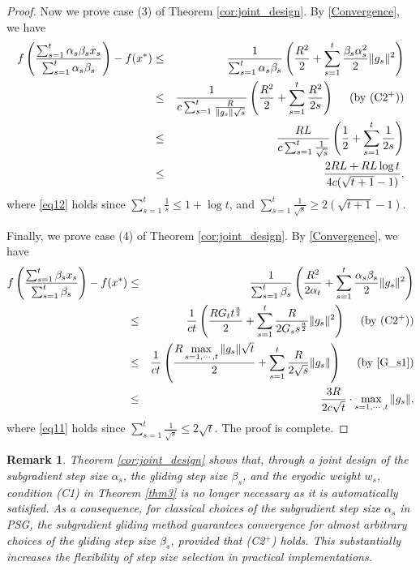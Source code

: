 \documentclass[sn-mathphys]{JORSC-jnl}%
\theoremstyle{thmstyleone}%
\newtheorem{remark}{Remark}[section]%
\theoremstyle{thmstylethree}%
\begin{document}
\begin{proof}
	Now we prove case (3) of Theorem \ref{cor:joint_design}. By \eqref{Convergence}, we have
	\begin{eqnarray}
		f\left( \frac{\sum_{s=1}^t \alpha_s\beta_s x_s}{\sum_{s=1}^t \alpha_s\beta_s} \right) - f(x^*) 
		&\leq& \frac{1}{\sum_{s=1}^{t}\alpha_s\beta_s}
		\left(
		\frac{R^2}{2}
		+ \sum_{s=1}^{t} \frac{\beta_s \alpha_s^2}{2} \Vert g_s \Vert^2
		\right)\nonumber\\
		&\leq&\frac{1}{c\sum_{s=1}^{t}\frac{R}{\|g_s\|\sqrt{s}}}\left(\frac{R^2}{2}+\sum_{s=1}^{t} \frac{R^2}{2s}\right)~~~~({\rm by~ (C2^+)})\nonumber\\
		&\leq&\frac{RL}{c\sum_{s=1}^{t}\frac{1}{\sqrt{s}}}\left(\frac{1}{2}+\sum_{s=1}^{t} \frac{1}{2s}\right)\nonumber\\
		&\leq& \frac{2RL+RL\log t}{4c(\sqrt{t+1}-1)}, \label{eq12}
	\end{eqnarray}
	where \eqref{eq12} holds since $\sum_{s=1}^{t}\frac{1}{s} \le 1 + \log t$, and $\sum_{s=1}^{t} \frac{1}{\sqrt{s}} \geq 2(\sqrt{t+1}-1)$.
	
	Finally, we prove case (4) of Theorem \ref{cor:joint_design}. By \eqref{Convergence}, we have
	\begin{eqnarray}
		f\left( \frac{\sum_{s=1}^t \beta_s x_s}{\sum_{s=1}^t \beta_s} \right) - f(x^*) 
		&\leq& \frac{1}{\sum_{s=1}^{t}\beta_s}
		\left(
		\frac{R^2}{2 \alpha_t}
		+ \sum_{s=1}^{t} \frac{\alpha_s \beta_s}{2} \Vert g_s \Vert^2
		\right)\nonumber\\
		&\leq&\frac{1}{ct}\left(\frac{RG_t t^{\frac{a}{2}}}{2}+\sum_{s=1}^{t} \frac{R}{2G_s s^{\frac{a}{2}}}\Vert g_s \Vert^2\right)~~~~({\rm by~ (C2^+)})\nonumber\\
		&\leq& \frac{1}{ct}\left(\frac{R\max\limits_{s=1,\cdots,t}\|g_s\| \sqrt{t}}{2}+\sum_{s=1}^{t} \frac{R}{2 \sqrt{s}}\Vert g_s \Vert\right)~~~~({\rm by~\eqref{G_s1}})\nonumber\\
		&\leq& \frac{3R}{2c\sqrt{t}}\cdot \max_{s=1,\cdots,t}\|g_s\|, \label{eq11}
	\end{eqnarray}
	where \eqref{eq11} holds since $\sum_{s=1}^{t} \frac{1}{\sqrt{s}} \le 2\sqrt{t}$. The proof is complete.
\end{proof}

\begin{remark}
	Theorem \ref{cor:joint_design} shows that, through a joint design of the subgradient step size $\alpha_s$, the gliding step size $\beta_s$, and the ergodic weight $w_s$, condition (C1) in Theorem \ref{thm3} is no longer necessary as it is automatically satisfied. As a consequence, for classical choices of the subgradient step size $\alpha_s$ in PSG, the subgradient gliding method guarantees convergence for almost arbitrary choices of the gliding step size $\beta_s$, provided that (C2$^+$) holds. This substantially increases the flexibility of step size selection in practical implementations.
\end{remark}
\end{document}
